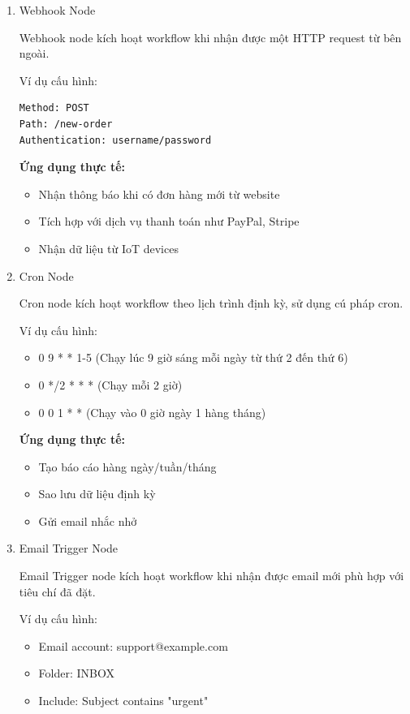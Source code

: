 \begin{enumerate}
    \item Webhook Node

Webhook node kích hoạt workflow khi nhận được một HTTP request từ bên ngoài.

Ví dụ cấu hình:
\begin{lstlisting}
Method: POST
Path: /new-order
Authentication: username/password
\end{lstlisting}

\textbf{Ứng dụng thực tế:}
\begin{itemize}
    \item Nhận thông báo khi có đơn hàng mới từ website
    \item Tích hợp với dịch vụ thanh toán như PayPal, Stripe
    \item Nhận dữ liệu từ IoT devices
\end{itemize}
\newpage 
\item Cron Node

Cron node kích hoạt workflow theo lịch trình định kỳ, sử dụng cú pháp cron.

Ví dụ cấu hình:
\begin{itemize}
    \item 0 9 * * 1-5    (Chạy lúc 9 giờ sáng mỗi ngày từ thứ 2 đến thứ 6)
    \item 0 */2 * * *    (Chạy mỗi 2 giờ)
    \item 0 0 1 * *      (Chạy vào 0 giờ ngày 1 hàng tháng)
\end{itemize}

\textbf{Ứng dụng thực tế:}
\begin{itemize}
    \item Tạo báo cáo hàng ngày/tuần/tháng
    \item Sao lưu dữ liệu định kỳ
    \item Gửi email nhắc nhở
\end{itemize}

\item Email Trigger Node

Email Trigger node kích hoạt workflow khi nhận được email mới phù hợp với tiêu chí đã đặt.

Ví dụ cấu hình:
\begin{itemize}
    \item Email account: support@example.com
    \item Folder: INBOX
    \item Include: Subject contains "urgent"
\end{itemize}


\end{enumerate}
